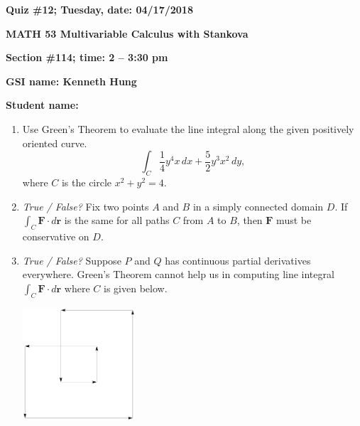 \documentclass{article}
\newcommand{\rr}{\mathbf{r}}
\begin{document}
{\bf Quiz \#12; Tuesday, date: 04/17/2018}

{\bf MATH 53 Multivariable Calculus with Stankova}

{\bf Section \#114; time: 2 -- 3:30 pm}

{\bf GSI name: Kenneth Hung}

{\bf Student name:}

\vspace*{0.25in}

\begin{enumerate}
\item Use Green's Theorem to evaluate the line integral along the given positively oriented curve.
\[
\int_C \frac{1}{4} y^4 x \,dx + \frac{5}{2}y^3 x^2 \,dy,
\]
where $C$ is the circle $x^2 + y^2 = 4$.

\item {\em True / False?} Fix two points $A$ and $B$ in a simply connected domain $D$. If $\int_C \mathbf{F} \cdot d\rr$ is the same for all paths $C$ from $A$ to $B$, then $\mathbf{F}$ must be conservative on $D$.

\item {\em True / False?} Suppose $P$ and $Q$ has continuous partial derivatives everywhere. Green's Theorem cannot help us in computing line integral $\int_C \mathbf{F} \cdot d\rr$ where $C$ is given below.
\begin{center}
\includegraphics[width=0.33\textwidth]{quiz12dis114pic}
\end{center}
\end{enumerate}
\end{document}
